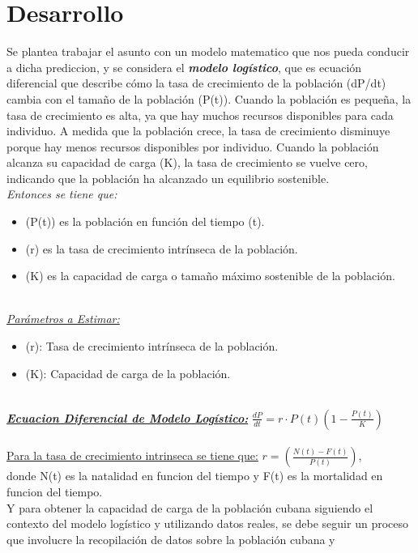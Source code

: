 \documentclass[a4paper,10pt,twocolumn]{article}
\begin{document}
\section{Desarrollo}\label{sec:dev}
 Se plantea trabajar el asunto con un modelo matematico que nos pueda conducir a dicha prediccion, y se considera 
 el \textit{\textbf{modelo logístico}}, que es ecuación diferencial que describe cómo la tasa de crecimiento de la población (dP/dt) 
 cambia con el tamaño de la población (P(t)). Cuando la población es pequeña, la tasa de crecimiento es alta, ya que 
 hay muchos recursos disponibles para cada individuo. A medida que la población crece, la tasa de crecimiento disminuye 
 porque hay menos recursos disponibles por individuo. Cuando la población alcanza su capacidad de carga (K), la tasa 
 de crecimiento se vuelve cero, indicando que la población ha alcanzado un equilibrio sostenible.\\
 \textit{Entonces se tiene que:}
\begin{itemize}
    \item (P(t)) es la población en función del tiempo (t).
    \item (r) es la tasa de crecimiento intrínseca de la población.
    \item (K) es la capacidad de carga o tamaño máximo sostenible de la población.
\end{itemize}\\
\textit{\underline{Parámetros a Estimar:}}
\begin{itemize}
    \item (r): Tasa de crecimiento intrínseca de la población. 
    \item (K): Capacidad de carga de la población.
\end{itemize}\\
\textit{\textbf{\underline{Ecuacion Diferencial de Modelo Logístico:}}} $\frac{dP}{dt} = r \cdot P(t)(1 - \frac{P(t)}{K}) $\\\\
\underline{Para la tasa de crecimiento intrinseca se tiene que:} $r = (\frac{N(t)-F(t)}{P(t)})$,\\ 
donde N(t) es la natalidad en funcion del tiempo y F(t) es la mortalidad en funcion del tiempo.\\
Y para obtener la capacidad de carga de la población cubana siguiendo el contexto del modelo logístico y utilizando 
datos reales, se debe seguir un proceso que involucre la recopilación de datos sobre la población cubana y 
\end{document}
